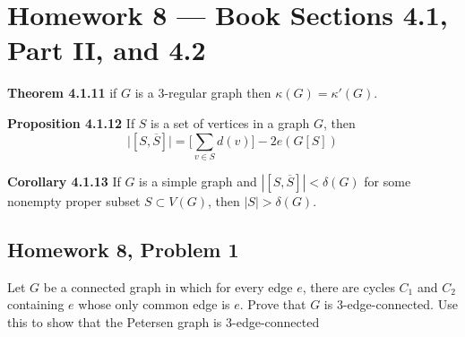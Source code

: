 \documentclass[12pt]{amsart}
\begin{document}
    \clearpage
    \section*{Homework 8 --- Book Sections 4.1, Part II, and 4.2}

    \noindent\textbf{Theorem 4.1.11} if $G$ is a 3-regular graph then $\kappa(G) = \kappa'(G)$.\par\medskip

    \noindent\textbf{Proposition 4.1.12} If $S$ is a set of vertices in a graph $G$, then
    \[
        \big|[S,\overline{S}]\big| = \Big[\sum_{v\in S}d(v)\Big] - 2e(G[S])
    \]
    \par\medskip

    \noindent\textbf{Corollary 4.1.13} If $G$ is a simple graph and $|[S,\overline{S}]| < \delta(G)$ for some
    nonempty proper subset $S\subset V(G)$, then $|S| > \delta(G)$.

    \par\medskip

    \subsection*{Homework 8, Problem 1} Let $G$ be a connected graph in which for every edge $e$, there are cycles $C_1$
    and $C_2$ containing $e$ whose only common edge is $e$.
    Prove that $G$ is 3-edge-connected.
    Use this to show that the Petersen graph is 3-edge-connected
\end{document}
